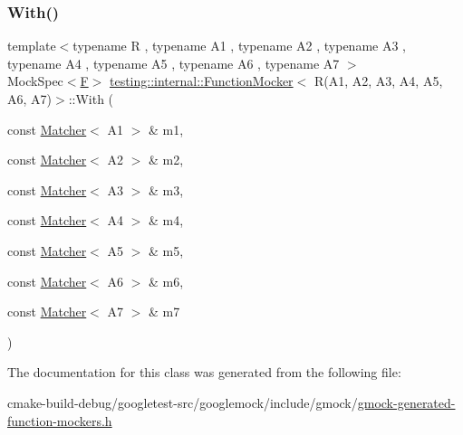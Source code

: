 \subsubsection{\texorpdfstring{With()}{With()}}
{\footnotesize\ttfamily template$<$typename R , typename A1 , typename A2 , typename A3 , typename A4 , typename A5 , typename A6 , typename A7 $>$ \\
Mock\+Spec$<$\mbox{\hyperlink{classtesting_1_1internal_1_1FunctionMocker_3_01R_07A1_00_01A2_00_01A3_00_01A4_00_01A5_00_01A6_00_01A7_08_4_a2ea0e33d9cc0d1f57d58b4aee98c117c}{F}}$>$ \mbox{\hyperlink{classtesting_1_1internal_1_1FunctionMocker}{testing\+::internal\+::\+Function\+Mocker}}$<$ R(A1, A2, A3, A4, A5, A6, A7)$>$\+::With (\begin{DoxyParamCaption}\item[{const \mbox{\hyperlink{classtesting_1_1Matcher}{Matcher}}$<$ A1 $>$ \&}]{m1,  }\item[{const \mbox{\hyperlink{classtesting_1_1Matcher}{Matcher}}$<$ A2 $>$ \&}]{m2,  }\item[{const \mbox{\hyperlink{classtesting_1_1Matcher}{Matcher}}$<$ A3 $>$ \&}]{m3,  }\item[{const \mbox{\hyperlink{classtesting_1_1Matcher}{Matcher}}$<$ A4 $>$ \&}]{m4,  }\item[{const \mbox{\hyperlink{classtesting_1_1Matcher}{Matcher}}$<$ A5 $>$ \&}]{m5,  }\item[{const \mbox{\hyperlink{classtesting_1_1Matcher}{Matcher}}$<$ A6 $>$ \&}]{m6,  }\item[{const \mbox{\hyperlink{classtesting_1_1Matcher}{Matcher}}$<$ A7 $>$ \&}]{m7 }\end{DoxyParamCaption})\hspace{0.3cm}{\ttfamily [inline]}}



The documentation for this class was generated from the following file\+:\begin{DoxyCompactItemize}
\item 
cmake-\/build-\/debug/googletest-\/src/googlemock/include/gmock/\mbox{\hyperlink{gmock-generated-function-mockers_8h}{gmock-\/generated-\/function-\/mockers.\+h}}\end{DoxyCompactItemize}
